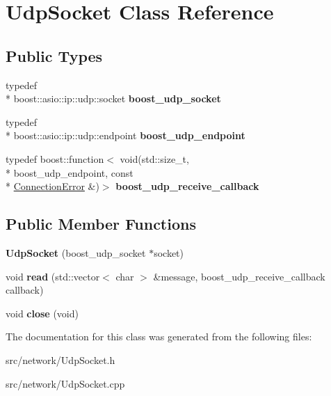 \hypertarget{class_udp_socket}{\section{Udp\-Socket Class Reference}
\label{class_udp_socket}
}
\subsection*{Public Types}
\begin{DoxyCompactItemize}
\item 
\hypertarget{class_udp_socket_afd559b85d846e8cef992545f30c5b3b0}{typedef \\*
boost\-::asio\-::ip\-::udp\-::socket {\bfseries boost\-\_\-udp\-\_\-socket}}\label{class_udp_socket_afd559b85d846e8cef992545f30c5b3b0}

\item 
\hypertarget{class_udp_socket_a324bdbd05605e528f3265b800883227b}{typedef \\*
boost\-::asio\-::ip\-::udp\-::endpoint {\bfseries boost\-\_\-udp\-\_\-endpoint}}\label{class_udp_socket_a324bdbd05605e528f3265b800883227b}

\item 
\hypertarget{class_udp_socket_ac90d6d3f07cee933b29bfe9ed8dbf9df}{typedef boost\-::function$<$ void(std\-::size\-\_\-t, \\*
boost\-\_\-udp\-\_\-endpoint, const \\*
\hyperlink{_connection_error_8h_a3eb2ebd912cc5460d23e45f7188a0a86}{Connection\-Error} \&)$>$ {\bfseries boost\-\_\-udp\-\_\-receive\-\_\-callback}}\label{class_udp_socket_ac90d6d3f07cee933b29bfe9ed8dbf9df}

\end{DoxyCompactItemize}
\subsection*{Public Member Functions}
\begin{DoxyCompactItemize}
\item 
\hypertarget{class_udp_socket_a1371a1e17aea3e7d09d109fca76642f3}{{\bfseries Udp\-Socket} (boost\-\_\-udp\-\_\-socket $\ast$socket)}\label{class_udp_socket_a1371a1e17aea3e7d09d109fca76642f3}

\item 
\hypertarget{class_udp_socket_a9f612f9ccdad75d96cd7414a7d3f74e7}{void {\bfseries read} (std\-::vector$<$ char $>$ \&message, boost\-\_\-udp\-\_\-receive\-\_\-callback callback)}\label{class_udp_socket_a9f612f9ccdad75d96cd7414a7d3f74e7}

\item 
\hypertarget{class_udp_socket_a361d4e11f87480dde40666bfdfb3ee31}{void {\bfseries close} (void)}\label{class_udp_socket_a361d4e11f87480dde40666bfdfb3ee31}

\end{DoxyCompactItemize}


The documentation for this class was generated from the following files\-:\begin{DoxyCompactItemize}
\item 
src/network/Udp\-Socket.\-h\item 
src/network/Udp\-Socket.\-cpp\end{DoxyCompactItemize}
